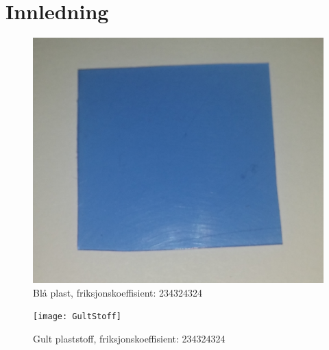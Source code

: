 \documentclass[10pt,a4paper]{report}
\begin{document}
\chapter*{Innledning}
\begin{figure}[p]
    \includegraphics[scale=0.05]{BlaaPlast}
    \caption{Blå plast, friksjonskoeffisient: 234324324}
    \label{fig:1}
\end{figure}
\begin{figure}[p]
    \texttt{[image: GultStoff]}
    \caption{Gult plaststoff, friksjonskoeffisient: 234324324}
    \label{fig:2}
\end{figure}
\end{document}
